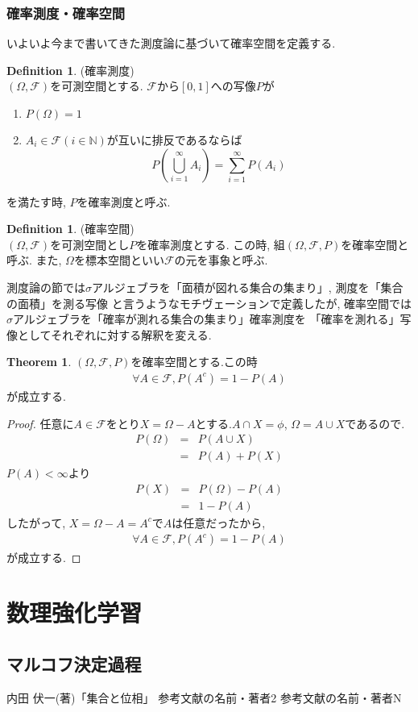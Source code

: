 \documentclass[11pt, a4paper, dvipdfmx]{jsbook}
\theoremstyle{definition}
\newtheorem{Definition+}[Axiom+]{Definition}
\newtheorem{Theorem+}[Axiom+]{Theorem}
\newcommand{\N}{\mathbb{N}}
\newcommand{\F}{\mathcal{F}}
\begin{document}
\section{確率測度・確率空間}
いよいよ今まで書いてきた測度論に基づいて確率空間を定義する. 
 \begin{Definition+}(確率測度)\\
   $(\Omega, \F)$を可測空間とする. $\F$から$[0, 1]$への写像$P$が
   \begin{enumerate}
    \item $P(\Omega) = 1$
    \item $A_{i}\in\F(i\in\N)$が互いに排反であるならば
    \begin{equation*}
      P\left(\bigcup_{i = 1}^{\infty}A_{i}\right) = \sum_{i = 1}^{\infty} P\left(A_{i}\right)
    \end{equation*}
  \end{enumerate}
  を満たす時, $P$を確率測度と呼ぶ.
 \end{Definition+}
 \begin{Definition+}(確率空間)\\
  $(\Omega, \F)$を可測空間とし$P$を確率測度とする. この時, 組$(\Omega, \F, P)$を確率空間と呼ぶ. また, $\Omega$を標本空間といい$\F$の元を事象と呼ぶ.
\end{Definition+}
測度論の節では$\sigma$アルジェブラを「面積が図れる集合の集まり」, 測度を「集合の面積」を測る写像
と言うようなモチヴェーションで定義したが, 確率空間では$\sigma$アルジェブラを「確率が測れる集合の集まり」確率測度を
「確率を測れる」写像としてそれぞれに対する解釈を変える.
\begin{Theorem+}
  $(\Omega, \F, P)$を確率空間とする.この時
    \begin{align*}
      \forall A\in\F, P(A^{c}) = 1 - P(A)
    \end{align*}
  が成立する.
  \begin{proof}
    任意に$A\in\F$をとり$X = \Omega - A$とする.$A\cap X = \phi$, $\Omega = A\cup X$であるので.
    \begin{eqnarray*}
      P(\Omega) &=& P(A\cup X)\\
                &=& P(A) + P(X)
    \end{eqnarray*}
    $P(A) < \infty$より
    \begin{eqnarray*}
      P(X) &=& P(\Omega) - P(A)\\
           &=& 1 - P(A)
    \end{eqnarray*}
    したがって, $X = \Omega - A = A^{c}$で$A$は任意だったから,
    \begin{align*}
      \forall A\in\F, P(A^{c}) = 1 - P(A)
    \end{align*}
    が成立する.
  \end{proof}
\end{Theorem+}

\part{数理強化学習}
\chapter{マルコフ決定過程}



\begin{thebibliography}{50}
   内田 伏一(著)「集合と位相」
   参考文献の名前・著者2
   参考文献の名前・著者N
\end{thebibliography}
\end{document}
